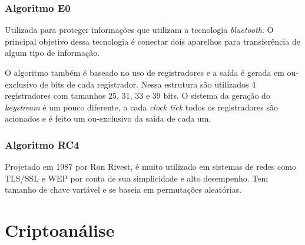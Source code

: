 \subsubsection{Algoritmo E0}
\label{algorithm-e0}

Utilizada para proteger informações que utilizam a tecnologia \textit{bluetooth}. O principal objetivo dessa tecnologia é conectar dois aparelhos para transferência de algum tipo de informação.

O algoritmo também é baseado no uso de registradores e a saída é gerada em ou-exclusivo de bits de cada registrador. Nessa estrutura são utilizados 4 registradores com tamanhos 25, 31, 33 e 39 bits. O sistema da geração do \textit{keystream} é um pouco diferente, a cada \textit{clock tick} todos os registradores são acionados e é feito um ou-exclusivo da saída de cada um.

\subsubsection{Algoritmo RC4}
\label{algorithm-rc4}

Projetado em 1987 por Ron Rivest, é muito utilizado em sistemas de redes como TLS/SSL e WEP por conta de sua simplicidade e alto desempenho. Tem tamanho de chave variável e se baseia em permutações aleatórias.

\section{Criptoanálise}